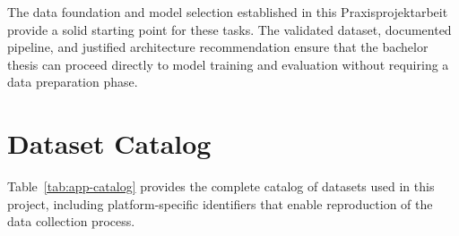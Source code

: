 \documentclass[a4paper,12pt,twoside]{report}
\begin{document}
The data foundation and model selection established in this Praxisprojektarbeit
provide a solid starting point for these tasks. The validated dataset, documented
pipeline, and justified architecture recommendation ensure that the bachelor
thesis can proceed directly to model training and evaluation without requiring
a data preparation phase.

\clearpage



\appendix
\clearpage

\chapter{Dataset Catalog}
\label{app:dataset-catalog}

Table~\ref{tab:app-catalog} provides the complete catalog of datasets used in
this project, including platform-specific identifiers that enable reproduction of
the data collection process.
\end{document}
